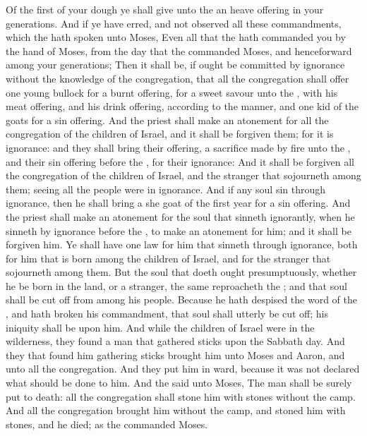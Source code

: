 \begin{biblechapter}
\verse Of the first of your dough ye shall give unto the \LORD an heave offering in your generations.
 And if ye have erred, and not observed all these commandments, which the \LORD hath spoken unto Moses,
\verse Even all that the \LORD hath commanded you by the hand of Moses, from the day that the \LORD commanded Moses, and henceforward among your generations;
\verse Then it shall be, if ought be committed by ignorance without the knowledge of the congregation, that all the congregation shall offer one young bullock for a burnt offering, for a sweet savour unto the \LORD, with his meat offering, and his drink offering, according to the manner, and one kid of the goats for a sin offering.
\verse And the priest shall make an atonement for all the congregation of the children of Israel, and it shall be forgiven them; for it is ignorance: and they shall bring their offering, a sacrifice made by fire unto the \LORD, and their sin offering before the \LORD, for their ignorance:
\verse And it shall be forgiven all the congregation of the children of Israel, and the stranger that sojourneth among them; seeing all the people were in ignorance.
\verse And if any soul sin through ignorance, then he shall bring a she goat of the first year for a sin offering.
\verse And the priest shall make an atonement for the soul that sinneth ignorantly, when he sinneth by ignorance before the \LORD, to make an atonement for him; and it shall be forgiven him.
\verse Ye shall have one law for him that sinneth through ignorance, both for him that is born among the children of Israel, and for the stranger that sojourneth among them.
\verse But the soul that doeth ought presumptuously, whether he be born in the land, or a stranger, the same reproacheth the \LORD; and that soul shall be cut off from among his people.
\verse Because he hath despised the word of the \LORD, and hath broken his commandment, that soul shall utterly be cut off; his iniquity shall be upon him.
 And while the children of Israel were in the wilderness, they found a man that gathered sticks upon the Sabbath day.
\verse And they that found him gathering sticks brought him unto Moses and Aaron, and unto all the congregation.
\verse And they put him in ward, because it was not declared what should be done to him.
\verse And the \LORD said unto Moses, The man shall be surely put to death: all the congregation shall stone him with stones without the camp.
\verse And all the congregation brought him without the camp, and stoned him with stones, and he died; as the \LORD commanded Moses.

\end{biblechapter}
